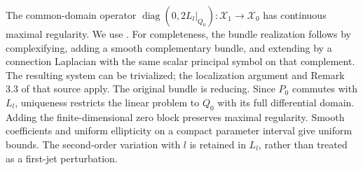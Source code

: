 \documentclass[11pt]{amsart}
\theoremstyle{definition}
\theoremstyle{remark}
\begin{document}
The common-domain operator
$\operatorname{diag}(0,2L_l|_{Q_0}):\mathcal X_1\to\mathcal X_0$
has continuous maximal regularity. We use
\cite[Theorem 3.6 and Proposition 3.7]{ShaoSimonett14}.
For completeness, the bundle realization follows by complexifying,
adding a smooth complementary bundle, and extending by a connection
Laplacian with the same scalar principal symbol on that complement.
The resulting system can be trivialized; the localization argument
and Remark 3.3 of that source apply. The original bundle is reducing.
Since $P_0$ commutes with $L_l$, uniqueness restricts the linear
problem to $Q_0$ with its full differential domain. Adding the
finite-dimensional zero block preserves maximal regularity.
Smooth coefficients and uniform ellipticity on a compact parameter
interval give uniform bounds. The second-order variation with $l$
is retained in $L_l$, rather than treated as a first-jet perturbation.
\end{document}
